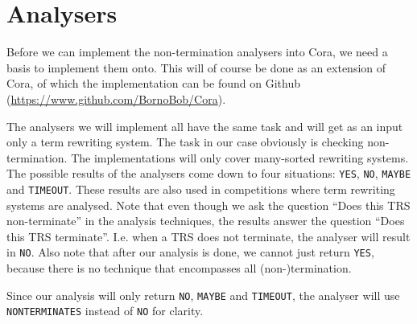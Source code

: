\chapter{Analysers}\label{analysers}
Before we can implement the non-termination analysers into Cora, we need a basis to implement them onto. This will of course be done as an extension of Cora, of which the implementation can be found on Github (\url{https://www.github.com/BornoBob/Cora}).

The analysers we will implement all have the same task and will get as an input only a term rewriting system. The task in our case obviously is checking non-termination. The implementations will only cover many-sorted rewriting systems. The possible results of the analysers come down to four situations: \texttt{YES}, \texttt{NO}, \texttt{MAYBE} and \texttt{TIMEOUT}. These results are also used in competitions where term rewriting systems are analysed\cite{TermPortal}. Note that even though we ask the question ``Does this TRS non-terminate'' in the analysis techniques, the results answer the question ``Does this TRS terminate''. I.e. when a TRS does not terminate, the analyser will result in \texttt{NO}. Also note that after our analysis is done, we cannot just return \texttt{YES}, because there is no technique that encompasses all (non-)termination. 

Since our analysis will only return \texttt{NO}, \texttt{MAYBE} and \texttt{TIMEOUT}, the analyser will use \texttt{NONTERMINATES} instead of \texttt{NO} for clarity. 